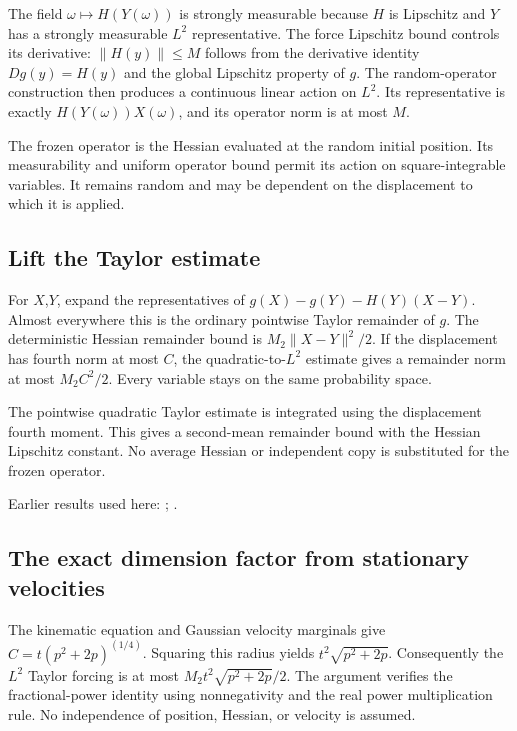 \documentclass[11pt,a4paper]{report}
\begin{document}
The field \(\omega \mapsto H(Y(\omega ))\) is strongly measurable because \(H\) is Lipschitz and \(Y\) has a strongly measurable \(L^{2}\) representative. The force Lipschitz bound controls its derivative: \(\|H(y)\|\le M\) follows from the derivative identity \(Dg(y)=H(y)\) and the global Lipschitz property of \(g\). The random-operator construction then produces a continuous linear action on \(L^{2}\). Its representative is exactly \(H(Y(\omega ))X(\omega )\), and its operator norm is at most \(M\).



The frozen operator is the Hessian evaluated at the random initial position. Its measurability and uniform operator bound permit its action on square-integrable variables. It remains random and may be dependent on the displacement to which it is applied.

\subsection{\texorpdfstring{Lift the Taylor estimate}{Lift the Taylor estimate}}
\label{report-step-KineticLangevin-LpHessian-lean-2}


For \(X\),\(Y\), expand the representatives of \(g(X)-g(Y)-H(Y)(X-Y)\). Almost everywhere this is the ordinary pointwise Taylor remainder of \(g\). The deterministic Hessian remainder bound is \(M_{2}\|X-Y\|^{2}/2\). If the displacement has fourth norm at most \(C\), the quadratic-to-\(L^{2}\) estimate gives a remainder norm at most \(M_{2}C^{2}/2\). Every variable stays on the same probability space.



The pointwise quadratic Taylor estimate is integrated using the displacement fourth moment. This gives a second-mean remainder bound with the Hessian Lipschitz constant. No average Hessian or independent copy is substituted for the frozen operator.



Earlier results used here: \cite[Section~3.13.2]{LangevinLean2026ULASC}; \cite[Section~3.13.3]{LangevinLean2026ULASC}.
\subsection{\texorpdfstring{The exact dimension factor from stationary velocities}{The exact dimension factor from stationary velocities}}
\label{report-step-KineticLangevin-LpHessian-lean-3}


The kinematic equation and Gaussian velocity marginals give \(C=t(p^{2}+2p)^(1/4)\). Squaring this radius yields \(t^{2}\sqrt{p^{2}+2p}\). Consequently the \(L^{2}\) Taylor forcing is at most \(M_{2}t^{2}\sqrt{p^{2}+2p}/2\). The argument verifies the fractional-power identity using nonnegativity and the real power multiplication rule. No independence of position, Hessian, or velocity is assumed.
\end{document}
